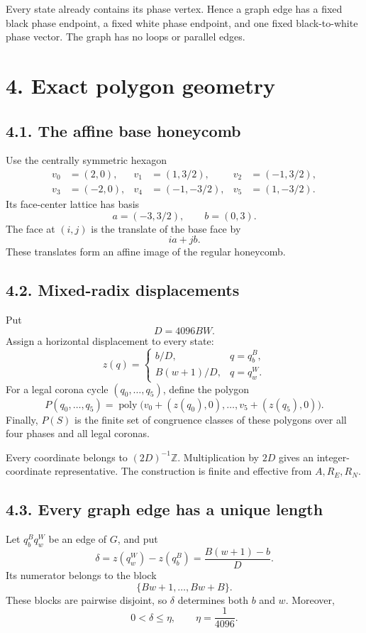 \documentclass[11pt]{article}
\begin{document}
Every state already contains its phase vertex. Hence a graph edge has a
fixed black phase endpoint, a fixed white phase endpoint, and one fixed
black-to-white phase vector. The graph has no loops or parallel edges.

\section*{4. Exact polygon geometry}

\subsection*{4.1. The affine base honeycomb}

Use the centrally symmetric hexagon
\[
\begin{aligned}
v_0&=(2,0),&
v_1&=(1,3/2),&
v_2&=(-1,3/2),\\
v_3&=(-2,0),&
v_4&=(-1,-3/2),&
v_5&=(1,-3/2).
\end{aligned}
\]
Its face-center lattice has basis
\[
  a=(-3,3/2),\qquad b=(0,3).
\]
The face at \((i,j)\) is the translate of the base face by
\[
  ia+jb.
\]
These translates form an affine image of the regular honeycomb.

\subsection*{4.2. Mixed-radix displacements}

Put
\[
  D=4096BW.
\]
Assign a horizontal displacement to every state:
\[
z(q)=
\begin{cases}
 b/D,&q=q^B_b,\\
 B(w+1)/D,&q=q^W_w.
\end{cases}
\]
For a legal corona cycle \((q_0,\ldots,q_5)\), define the polygon
\[
  P(q_0,\ldots,q_5)
  =
  \operatorname{poly}
  \bigl(v_0+(z(q_0),0),\ldots,v_5+(z(q_5),0)\bigr).
\]
Finally, \(P(S)\) is the finite set of congruence classes of these polygons
over all four phases and all legal coronas.

Every coordinate belongs to \((2D)^{-1}\mathbb Z\). Multiplication by
\(2D\) gives an integer-coordinate representative. The construction is
finite and effective from \(A,R_E,R_N\).

\subsection*{4.3. Every graph edge has a unique length}

Let \(q^B_bq^W_w\) be an edge of \(G\), and put
\[
  \delta=z(q^W_w)-z(q^B_b)
  =\frac{B(w+1)-b}{D}.
\]
Its numerator belongs to the block
\[
  \{Bw+1,\ldots,Bw+B\}.
\]
These blocks are pairwise disjoint, so \(\delta\) determines both \(b\) and
\(w\). Moreover,
\[
  0<\delta\leq\eta,\qquad \eta=\frac1{4096}.
\]
\end{document}
